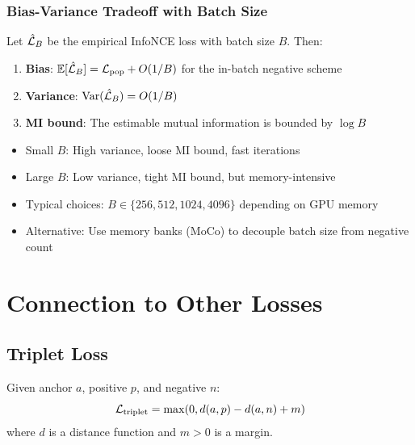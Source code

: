 \begin{notechapter}
\subsubsection{Bias-Variance Tradeoff with Batch Size}

\begin{theorem}
\label{contrastive-rigorous:thm:batch_effects}
Let $\hat{\mathcal{L}}_B$ be the empirical InfoNCE loss with batch size $B$. Then:
\begin{enumerate}[label=(\roman*)]
    \item \textbf{Bias}: $\mathbb{E}[\hat{\mathcal{L}}_B] = \mathcal{L}_{\text{pop}} + O(1/B)$ for the in-batch negative scheme
    \item \textbf{Variance}: $\text{Var}(\hat{\mathcal{L}}_B) = O(1/B)$
    \item \textbf{MI bound}: The estimable mutual information is bounded by $\log B$
\end{enumerate}
\end{theorem}

\begin{keyresult}
\begin{itemize}
    \item Small $B$: High variance, loose MI bound, fast iterations
    \item Large $B$: Low variance, tight MI bound, but memory-intensive
    \item Typical choices: $B \in \{256, 512, 1024, 4096\}$ depending on GPU memory
    \item Alternative: Use memory banks (MoCo) to decouple batch size from negative count
\end{itemize}
\end{keyresult}

\section{Connection to Other Losses}

\subsection{Triplet Loss}

\begin{definition}
Given anchor $a$, positive $p$, and negative $n$:
\begin{equation}
\mathcal{L}_{\text{triplet}} = \max(0, d(a,p) - d(a,n) + m)
\end{equation}
where $d$ is a distance function and $m > 0$ is a margin.
\end{definition}


\end{notechapter}
